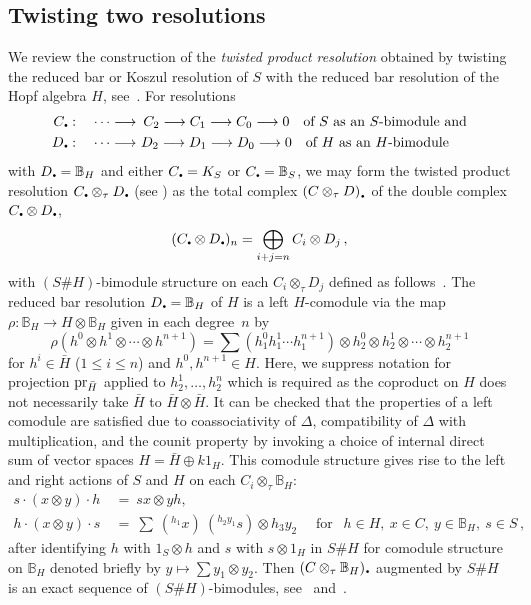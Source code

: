 \documentclass[11pt]{amsart}
\numberwithin{equation}{section}
\newcommand{\pr}{ {\rm{pr}} }%
\newcommand{\sd}{_{\DOT}}%
\newcommand{\BB}{\mathbb{B}} %
\newcommand{\DOT}{\setlength{\unitlength}{1.2pt}\begin{picture}(2.5,2)
               (1,1)\put(2.5,2.5){\circle*{2}}\end{picture}}
\renewcommand{\_}[1]{\mbox{$_{\left( #1 \right)}$}}
\newcommand{\ot}{\otimes}
\newcommand{\ott}{\otimes_{\tau}}
\newcommand{\Ho}{H}%
\begin{document}
{ 
\subsection*{Twisting two resolutions}
We review the construction of the {\em twisted product resolution} obtained by twisting
the reduced bar or Koszul resolution of $S$
with the reduced bar resolution of the Hopf algebra $\Ho$,
see~\cite{SW-twisted,TTP-AWEZ}. 
For resolutions 
$$
\begin{aligned}
  C\sd:\quad \cdots \longrightarrow & \ \, C_2 \longrightarrow
  C_1 \longrightarrow C_0 \longrightarrow 0
\ \ \text{ of } S \text{ as an $S$-bimodule and}\\
D \sd:\quad \cdots \longrightarrow & \ D_2 \longrightarrow D_1 \longrightarrow D_0 \longrightarrow 0
\ \ \text{ of } H \text{ as an $H$-bimodule}\, 
\end{aligned}
$$
with $D\sd=\BB_H$  and either $C\sd=K_S$ or $C\sd=\BB_S$,
we may form
the twisted product resolution $C\sd \ott D\sd$
(see \cite{SW-twisted,TTP-AWEZ})
as 
the total complex $(C\ott D)_{\sd}$ of the double complex 
$C\sd\ot D\sd$, 
\begin{equation}\label{eqn:res-X}
 (C\sd\ot D\sd)_n = \bigoplus_{i+j=n} C_i \ot D_j\,
  ,
\end{equation}
with $(S\# \Ho)$-bimodule structure on each $C_i \ott D_j$ 
defined as follows~\cite[Example 10.8]{TTP-AWEZ}.
The reduced bar resolution $D\sd = \BB_H$ of $H$
is a left $H$-comodule via the map $\rho : \BB_H \rightarrow H\ot \BB_H$
given in each degree~$n$ by 
\[
  \rho (h^0\ot h^1\ot\cdots \ot h^{n+1} ) = 
   \sum (h_1^0h_1^1\cdots  h_1^{n+1} ) \ot h_2^0 \ot h_2^1\ot 
    \cdots\ot h_2^{n+1}
\]
for $h^i\in \bar{H}$ ($1\leq i\leq n$)
and $h^0, h^{n+1}\in H$.
Here, we suppress notation for projection $\pr_{\bar H}$
applied to  $h^1_2,\ldots, h^n_2$
which is required 
as the coproduct on $H$
does not necessarily take $\bar H$ to $\bar H \ot \bar H$.
It can be checked that 
the properties of a left comodule are satisfied due to 
coassociativity 
of $\Delta$, compatibility of $\Delta$ with multiplication,
and the counit property
by invoking a choice of internal direct sum of vector spaces
$H = \bar H\oplus k 1_H$.
This comodule structure gives rise to the left and right actions of $S$ and $H$
on each $C_i\ot_{\tau} \BB_H$:
\begin{equation}
  \label{TwistedResolutionAction} 
  \begin{aligned}
   s \cdot (x\ot y)\cdot h
   \ &= \    s x\ot y h,
\\  h \cdot (x\ot y)\cdot s 
   \ &= \
   \sum\ ( {}^{h_1}x) \ ( {}^{h_2y_1}s) \ot 
   h_3 y_2  
\quad\text{ for }\ \ 
h\in \Ho,\ x\in C , \ y\in \BB_H,\ s\in S\, ,
\end{aligned}
\end{equation}
after identifying $h$ with $1_S\ot h$ and $s$ with $s\ot 1_H$
in $S\#H$ for comodule structure on $\BB_H$ denoted briefly by
$y\mapsto \sum y_1\ot y_2$.
%
Then $(C\ott \BB_H)\sd$ augmented by $S\# \Ho$
is an exact sequence of $(S\# \Ho)$-bimodules,
see~\cite[Lemma~3.5]{SW-twisted} and~\cite{TTP-AWEZ}.




}
\end{document}
